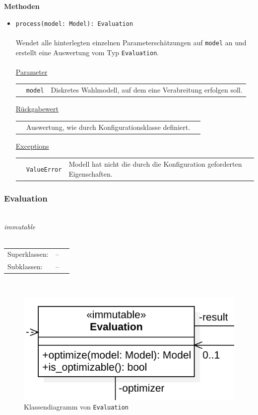 \documentclass{article}
\begin{document}
\textbf{Methoden}
\begin{itemize}\setlength\itemsep{3em}
\item \texttt{process(model: Model): Evaluation}\\\\
Wendet alle hinterlegten einzelnen Parameterschätzungen auf \texttt{model} an und erstellt eine Auswertung vom Typ \texttt{Evaluation}.
\\\\
\underline{Parameter}\\
\begin{tabular}{lll}
 & \texttt{model} & Diskretes Wahlmodell, auf dem eine Verabreitung erfolgen soll.\\
\end{tabular}

\underline{Rückgabewert}\\
\begin{tabular}{lll}
 & Auswertung, wie durch Konfigurationsklasse definiert.\\
\end{tabular}

\underline{Exceptions}\\
\begin{tabular}{lll}
 & \texttt{ValueError} & Modell hat nicht die durch die Konfiguration geforderten Eigenschaften.\\
\end{tabular}
\end{itemize}

\subsubsection*{\large{\textbf{Evaluation}\label{cls:Evaluation}}}\\
\textit{\flqq{}immutable\frqq}\normalsize\\\\
\begin{tabular}{lll}
 Superklassen: & --\\
 Subklassen: & --
\end{tabular}\\
\begin{figure}[H]%
    \centering
    \includegraphics[width=13cm]{entwurf/Entwurf_dokument/img/cls/model/Evaluation.png}
    \caption{Klassendiagramm von \texttt{Evaluation}}
\end{figure}
\end{document}
